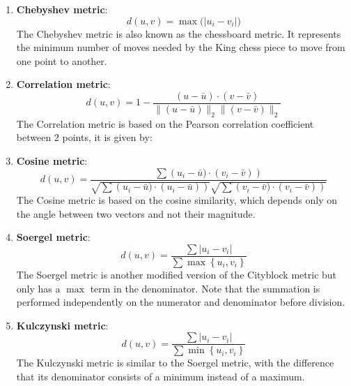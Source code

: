 \documentclass[conference]{IEEEtran}
\begin{document}
\begin{enumerate}
    \item \textbf{Chebyshev metric}:\\
    \begin{equation} \label{eq:chebyshev_metric}
        d(u,v)=\max\big(|u_i-v_i|\big)
    \end{equation}
    The Chebyshev metric is also known as the chessboard metric. It represents the minimum number of moves needed by the King chess piece to move from one point to another.

    \item \textbf{Correlation metric}:\\
    \begin{equation} \label{eq:correlation_metric}
        d(u,v)=1-\frac{(u-\bar{u}) \cdot(v-\bar{v})}{\|(u-\bar{u})\|_{2}\|(v-\bar{v})\|_{2}}
    \end{equation}
    The Correlation metric is based on the Pearson correlation coefficient between 2 points, it is given by:

    \item \textbf{Cosine metric}:\\
    \begin{equation} \label{eq:cosine_metric}
        d(u,v)=\frac{\sum\left(u_{i}-\bar{u})\cdot(v_{i}-\bar{v})\right)}{\sqrt{\sum\left(u_{i}-\bar{u})\cdot(u_{i}-\bar{u})\right)}\sqrt{\sum\left(v_{i}-\bar{v})\cdot(v_{i}-\bar{v})\right)}}
    \end{equation}
    The Cosine metric is based on the cosine similarity, which depends only on the angle between two vectors and not their magnitude.

    \item \textbf{Soergel metric}:\\
    \begin{equation} \label{eq:soergel_metric}
        d(u,v)=\frac{\sum\left|u_{i}-v_{i}\right|}{\sum \max \left\{u_{i}, v_{i}\right\}}
    \end{equation}
    The Soergel metric is another modified version of the Cityblock metric but only has a $\max$ term in the denominator. Note that the summation is performed independently on the numerator and denominator before division.

    \item \textbf{Kulczynski metric}:\\
    \begin{equation} \label{eq:kulczynski_metric}
        d(u,v)=\frac{\sum\left|u_{i}-v_{i}\right|}{\sum \min \left\{u_{i}, v_{i}\right\}}
    \end{equation}
    The Kulczynski metric is similar to the Soergel metric, with the difference that its denominator consists of a minimum instead of a maximum.


\end{enumerate}
\end{document}
